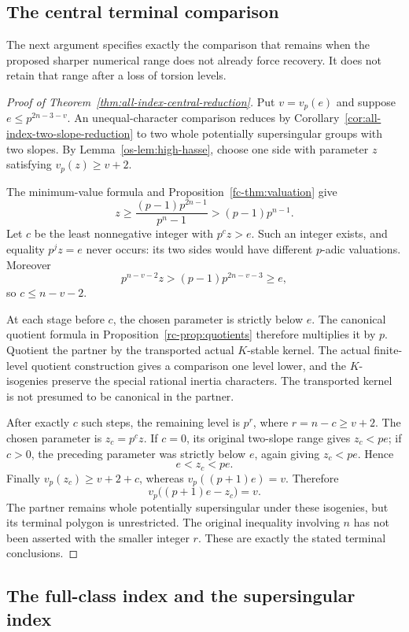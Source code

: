 \subsection{The central terminal comparison}

The next argument specifies exactly the comparison that remains
when the proposed sharper numerical range does not already force
recovery.  It does not retain that range after a loss of torsion
levels.

\begin{proof}[Proof of Theorem~\ref{thm:all-index-central-reduction}]
Put $v=v_p(e)$ and suppose $e\le p^{2n-3-v}$.  An
unequal-character comparison reduces by
Corollary~\ref{cor:all-index-two-slope-reduction} to two whole
potentially supersingular groups with two slopes.  By
Lemma~\ref{os-lem:high-hasse}, choose one side with parameter $z$
satisfying $v_p(z)\ge v+2$.

The minimum-value formula and Proposition~\ref{fc-thm:valuation} give
\[
 z\ge\frac{(p-1)p^{2n-1}}{p^n-1}>(p-1)p^{n-1}.
\]
Let $c$ be the least nonnegative integer with $p^cz>e$.  Such an
integer exists, and equality $p^jz=e$ never occurs: its two sides
would have different $p$-adic valuations.  Moreover
\[
 p^{n-v-2}z>(p-1)p^{2n-v-3}\ge e,
\]
so $c\le n-v-2$.

At each stage before $c$, the chosen parameter is strictly below
$e$.  The canonical quotient formula in
Proposition~\ref{rc-prop:quotients} therefore multiplies it by $p$.
Quotient the partner by the transported actual $K$-stable kernel.
The actual finite-level quotient construction gives a comparison
one level lower, and the $K$-isogenies preserve the special rational
inertia characters.  The transported kernel is not presumed to be
canonical in the partner.

After exactly $c$ such steps, the remaining level is $p^r$, where
$r=n-c\ge v+2$.  The chosen parameter is $z_c=p^cz$.  If $c=0$,
its original two-slope range gives $z_c<pe$; if $c>0$, the preceding
parameter was strictly below $e$, again giving $z_c<pe$.  Hence
\[
 e<z_c<pe.
\]
Finally $v_p(z_c)\ge v+2+c$, whereas
$v_p((p+1)e)=v$.  Therefore
\[
 v_p\bigl((p+1)e-z_c\bigr)=v.
\]
The partner remains whole potentially supersingular under these
isogenies, but its terminal polygon is unrestricted.  The original
inequality involving $n$ has not been asserted with the smaller
integer $r$.  These are exactly the stated terminal conclusions.
\end{proof}

\subsection{The full-class index and the supersingular index}

